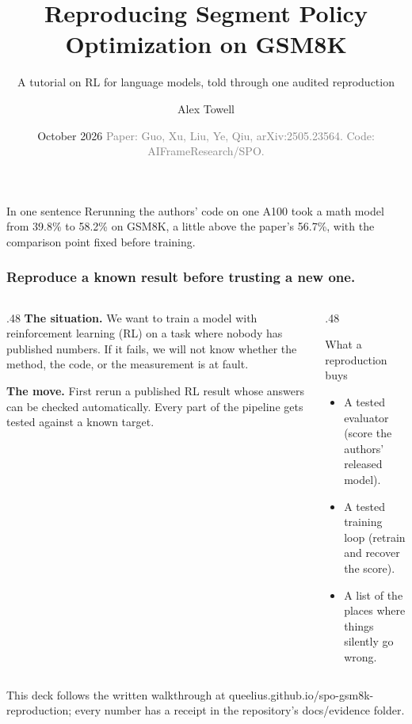\documentclass[aspectratio=169,11pt]{beamer}
\title{Reproducing Segment Policy Optimization on GSM8K}
\subtitle{A tutorial on RL for language models, told through one audited reproduction}
\author{Alex Towell}
\date{October 2026 \quad\textcolor{Gray}{Paper: Guo, Xu, Liu, Ye, Qiu, arXiv:2505.23564. Code: AIFrameResearch/SPO.}}
\newcommand{\source}[1]{\vfill{\scriptsize\color{Gray}#1\par}}
\begin{document}
\begin{frame}[plain]
\titlepage
\vfill
\begin{block}{In one sentence}
Rerunning the authors' code on one A100 took a math model from 39.8\% to 58.2\% on GSM8K,
a little above the paper's 56.7\%, with the comparison point fixed before training.
\end{block}
\end{frame}

\begin{frame}[t]
\frametitle{Reproduce a known result before trusting a new one.}
\begin{columns}[T,onlytextwidth]
\begin{column}{.48\textwidth}
\textbf{The situation.} We want to train a model with reinforcement learning (RL) on a task
where nobody has published numbers. If it fails, we will not know whether the method, the
code, or the measurement is at fault.
\medskip

\textbf{The move.} First rerun a published RL result whose answers can be checked
automatically. Every part of the pipeline gets tested against a known target.
\end{column}
\begin{column}{.48\textwidth}
\begin{block}{What a reproduction buys}
\begin{itemize}
\item A tested evaluator (score the authors' released model).
\item A tested training loop (retrain and recover the score).
\item A list of the places where things silently go wrong.
\end{itemize}
\end{block}
\end{column}
\end{columns}
\source{This deck follows the written walkthrough at queelius.github.io/spo-gsm8k-reproduction; every number has a receipt in the repository's docs/evidence folder.}
\end{frame}
\end{document}
